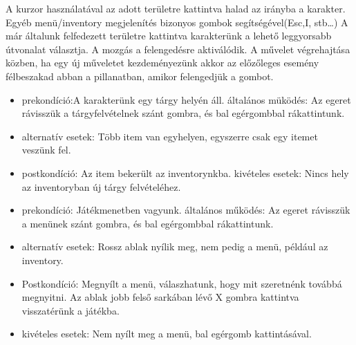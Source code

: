 
\newpage
{}

A kurzor használatával az adott területre kattintva halad az irányba a karakter.
Egyéb menü/inventory megjelenítés bizonyos gombok segítségével(Esc,I, stb…)
A már általunk felfedezett területre kattintva karakterünk a lehető leggyorsabb útvonalat választja.
A mozgás a felengedésre aktiválódik.
A művelet végrehajtása közben, ha egy új műveletet kezdeményezünk akkor az előzőleges esemény félbeszakad abban a pillanatban, amikor felengedjük a gombot.


\newpage
{}


\begin{itemize}
    \item prekondíció:A karakterünk egy tárgy helyén áll.
    általános müködés: Az egeret rávisszük a tárgyfelvételnek szánt gombra, és bal egérgombbal rákattintunk.
    \item alternatív esetek: Több item van egyhelyen, egyszerre csak egy itemet veszünk fel.
    \item postkondíció: Az item bekerült az inventorynkba.
    kivételes esetek: Nincs hely az inventoryban új tárgy felvételéhez.
\end{itemize}


\begin{itemize}
    \item prekondíció: Játékmenetben vagyunk.
    általános működés: Az egeret rávisszük a menünek szánt gombra, és bal egérgombbal rákattintunk.
    \item alternatív esetek: Rossz ablak nyílik meg, nem pedig a menü, például az inventory.
    \item Postkondíció: Megnyílt a menü, válaszhatunk, hogy mit szeretnénk továbbá megnyitni. Az ablak jobb felső sarkában lévő X gombra kattintva visszatérünk a játékba.
    \item kivételes esetek: Nem nyílt meg a menü, bal egérgomb kattintásával.
\end{itemize}

